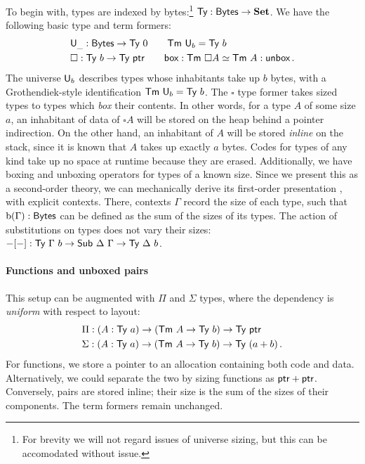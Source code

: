 To begin with, types are indexed by
bytes:\footnote{For brevity we will not regard issues of universe sizing, but this can
	be accomodated without issue.} $\textsf{Ty} : \textsf{Bytes} \to \textbf{Set}$.
We have the following basic type and term formers:
\begin{align*}
	 & \univ_{\_} : \Bytes \to \Ty\ 0\qquad \Tm\ \univ_b = \Ty\ b                                      \\
	 & \square : \Ty\ b \to \Ty\ \ptr\qquad \syn{box} : \Tm\ \square A \simeq \Tm\ A : \syn{unbox} \,.
\end{align*}
The universe \(\textsf{U}_b\) describes types whose inhabitants take up \(b\) bytes, with a Grothendiek-style
identification $\textsf{Tm}\ \textsf{U}_b = \textsf{Ty}\ b$. The \(\square\) type former takes sized types
to types which \emph{box} their contents. In other words, for a type $A$ of some
size $a$, an inhabitant of data of \(\square A\) will be stored on the heap
behind a pointer indirection. On the other hand, an inhabitant of \(A\) will be
stored \emph{inline} on the stack, since it is known that \(A\) takes up exactly
\(a\) bytes. Codes for types of any kind take up no space at runtime because
they are erased. Additionally, we have boxing and unboxing operators for types
of a known size. Since we present this as a second-order theory, we can mechanically derive
its first-order presentation \cite{Kaposi2024-db}, with explicit contexts. There, contexts $\Gamma$
record the size of each type, such that $\textrm{b}( \Gamma) : \textsf{Bytes}$ can be defined as
the sum of the sizes of its types. The action of substitutions on types does not
vary their sizes: $-[-] : \Ty\ \Gamma\ b \to \Sub\ \Delta\ \Gamma \to \Ty\
	\Delta\ b$.

\paragraph{Functions and unboxed pairs}\label{function-types}

This setup can be augmented with $\Pi$ and $\Sigma$ types, where the dependency
is \emph{uniform} with respect to layout:
\begin{align*}
	 & \Pi : (A : \Ty\ a) \to (\Tm\ A \to \Ty\ b) \to \Ty\ \ptr           \\
	 & \Sigma : (A : \Ty\ a) \to (\Tm\ A \to \Ty\ b) \to \Ty\ (a + b) \,.
\end{align*}
For functions, we store a pointer to an allocation containing both code and data.
Alternatively, we could separate the two by sizing functions as $\textsf{ptr} + \textsf{ptr}$.
Conversely, pairs are stored inline; their size is the sum of the sizes of their
components. The term formers remain unchanged.


